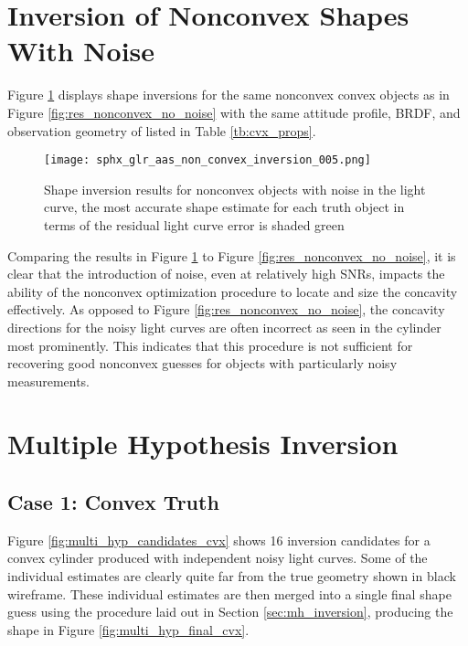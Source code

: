 \clearpage
\section{Inversion of Nonconvex Shapes With Noise}

Figure \ref{fig:res_nonconvex_with_noise} displays shape inversions for the same nonconvex convex objects as in Figure \ref{fig:res_nonconvex_no_noise} with the same attitude profile, BRDF, and observation geometry of listed in Table \ref{tb:cvx_props}.

\begin{figure}[!htb]
  \centering
  \texttt{[image: sphx\_glr\_aas\_non\_convex\_inversion\_005.png]}
  \caption{Shape inversion results for nonconvex objects with noise in the light curve, the most accurate shape estimate for each truth object in terms of the residual light curve error is shaded green}
  \label{fig:res_nonconvex_with_noise}
\end{figure}

Comparing the results in Figure \ref{fig:res_nonconvex_with_noise} to Figure \ref{fig:res_nonconvex_no_noise}, it is clear that the introduction of noise, even at relatively high SNRs, impacts the ability of the nonconvex optimization procedure to locate and size the concavity effectively. As opposed to Figure \ref{fig:res_nonconvex_no_noise}, the concavity directions for the noisy light curves are often incorrect as seen in the cylinder most prominently. This indicates that this procedure is not sufficient for recovering good nonconvex guesses for objects with particularly noisy measurements.

\section{Multiple Hypothesis Inversion}

\subsection{Case 1: Convex Truth}

Figure \ref{fig:multi_hyp_candidates_cvx} shows 16 inversion candidates for a convex cylinder produced with independent noisy light curves. Some of the individual estimates are clearly quite far from the true geometry shown in black wireframe. These individual estimates are then merged into a single final shape guess using the procedure laid out in Section \ref{sec:mh_inversion}, producing the shape in Figure \ref{fig:multi_hyp_final_cvx}.

